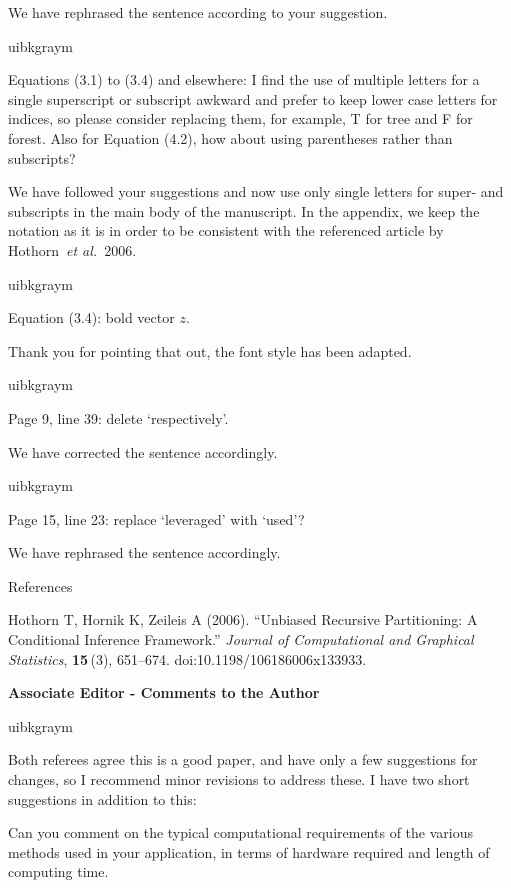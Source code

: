 \documentclass[english, noconfig]{uibklttr}
\newcommand{\section}[1]{{\Large{\textbf{#1}}}}
\newenvironment{re}{
    \begin{color}{uibkgraym}
        \itshape
}{
    \end{color}
}
\begin{document}
We have rephrased the sentence according to your suggestion.

\vspace{0.5em}
\begin{re}
Equations (3.1) to (3.4) and elsewhere: I find the use of multiple letters for a single superscript or subscript awkward and prefer to keep lower case letters for indices, so please consider replacing them, for example, T for tree and F for forest. Also for Equation (4.2), how about using parentheses rather than subscripts?
\end{re}

We have followed your suggestions and now use only single letters for super-
and subscripts in the main body of the manuscript. In the appendix, we keep the
notation as it is in order to be consistent with the referenced article by Hothorn~\emph{et al.}~2006.

\vspace{0.5em}
\begin{re}
Equation (3.4): bold vector $z$.
\end{re}

Thank you for pointing that out, the font style has been adapted.

\vspace{0.5em}
\begin{re}
Page 9, line 39: delete `respectively'.
\end{re}

We have corrected the sentence accordingly.

\vspace{0.5em}
\begin{re}
Page 15, line 23: replace `leveraged' with `used'?
\end{re}

We have rephrased the sentence accordingly.

\vspace{0.5cm}
References

Hothorn T, Hornik K, Zeileis A (2006). ``Unbiased Recursive Partitioning: A Conditional
Inference Framework.'' \emph{Journal of Computational and Graphical Statistics}, \textbf{15}\,(3), 651--674.
doi:10.1198/106186006x133933.

\newpage

\section{Associate Editor - Comments to the Author}

\begin{re}
Both referees agree this is a good paper, and have only a few suggestions for
changes, so I recommend minor revisions to address these. I have two short suggestions in addition to this:

Can you comment on the typical computational requirements of the various
methods used in your application, in terms of hardware required and length of
computing time.
\end{re}
\end{document}

